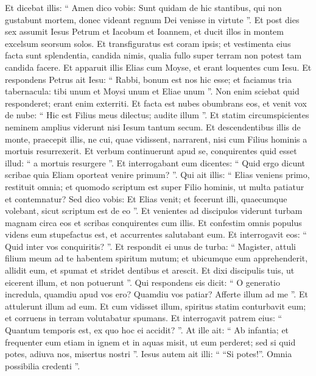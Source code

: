 \begin{biblechapter}
\begin{biblechapter}
\begin{biblechapter}
\begin{biblechapter}
\begin{biblechapter}
\begin{biblechapter}
\begin{biblechapter}
\begin{biblechapter}
\begin{biblechapter}
\verse Et dicebat illis: “ Amen dico vobis: Sunt quidam de hic stantibus, qui non gustabunt mortem, donec videant regnum Dei venisse in virtute ”.
 \verse Et post dies sex assumit Iesus Petrum et Iacobum et Ioannem, et ducit illos in montem excelsum seorsum solos. Et transfiguratus est coram ipsis; 
\verse et vestimenta eius facta sunt splendentia, candida nimis, qualia fullo super terram non potest tam candida facere. 
\verse Et apparuit illis Elias cum Moyse, et erant loquentes cum Iesu. 
\verse Et respondens Petrus ait Iesu: “ Rabbi, bonum est nos hic esse; et faciamus tria tabernacula: tibi unum et Moysi unum et Eliae unum ”. 
 \verse Non enim sciebat quid responderet; erant enim exterriti. 
\verse Et facta est nubes obumbrans eos, et venit vox de nube: “ Hic est Filius meus dilectus; audite illum ”. 
\verse Et statim circumspicientes neminem amplius viderunt nisi Iesum tantum secum.
 \verse Et descendentibus illis de monte, praecepit illis, ne cui, quae vidissent, narrarent, nisi cum Filius hominis a mortuis resurrexerit. 
\verse Et verbum continuerunt apud se, conquirentes quid esset illud: “ a mortuis resurgere ”. 
\verse Et interrogabant eum dicentes: “ Quid ergo dicunt scribae quia Eliam oporteat venire primum? ”. 
\verse Qui ait illis: “ Elias veniens primo, restituit omnia; et quomodo scriptum est super Filio hominis, ut multa patiatur et contemnatur? 
\verse Sed dico vobis: Et Elias venit; et fecerunt illi, quaecumque volebant, sicut scriptum est de eo ”.
 \verse Et venientes ad discipulos viderunt turbam magnam circa eos et scribas conquirentes cum illis. 
\verse Et confestim omnis populus videns eum stupefactus est, et accurrentes salutabant eum. 
\verse Et interrogavit eos: “ Quid inter vos conquiritis? ”. 
\verse Et respondit ei unus de turba: “ Magister, attuli filium meum ad te habentem spiritum mutum; 
\verse et ubicumque eum apprehenderit, allidit eum, et spumat et stridet dentibus et arescit. Et dixi discipulis tuis, ut eicerent illum, et non potuerunt ”. 
\verse Qui respondens eis dicit: “ O generatio incredula, quamdiu apud vos ero? Quamdiu vos patiar? Afferte illum ad me ”. 
\verse Et attulerunt illum ad eum. Et cum vidisset illum, spiritus statim conturbavit eum; et corruens in terram volutabatur spumans. 
\verse Et interrogavit patrem eius: “ Quantum temporis est, ex quo hoc ei accidit? ”. At ille ait: “ Ab infantia; 
\verse et frequenter eum etiam in ignem et in aquas misit, ut eum perderet; sed si quid potes, adiuva nos, misertus nostri ”. 
\verse Iesus autem ait illi: “ “Si potes!”. Omnia possibilia credenti ”. 

\end{biblechapter}
\end{biblechapter}
\end{biblechapter}
\end{biblechapter}
\end{biblechapter}
\end{biblechapter}
\end{biblechapter}
\end{biblechapter}
\end{biblechapter}

